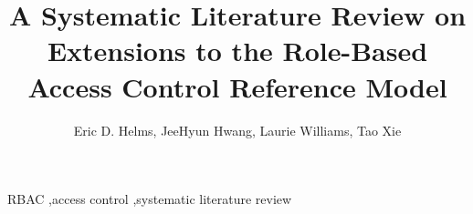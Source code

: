 \documentclass[3p,12pt]{elsarticle}
\begin{document}
\begin{frontmatter}

\title{A Systematic Literature Review on Extensions to the Role-Based Access Control Reference Model}
	
\author{Eric D. Helms, JeeHyun Hwang, Laurie Williams, Tao Xie}
\address{North Carolina State University}
\address{Department of Computer Science}
\address{890 Oval Drive, Box 8206}
\address{Raleigh, NC 27695-2858}




\begin{keyword}
RBAC \sep access control \sep systematic literature review
\end{keyword}

\end{frontmatter}




		











\end{document}
